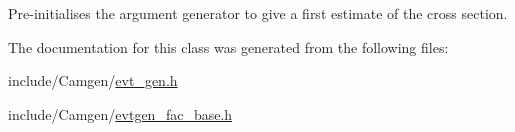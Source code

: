 Pre-\/initialises the argument generator to give a first estimate of the cross section. 



The documentation for this class was generated from the following files\+:\begin{DoxyCompactItemize}
\item 
include/\+Camgen/\hyperlink{a00634}{evt\+\_\+gen.\+h}\item 
include/\+Camgen/\hyperlink{a00636}{evtgen\+\_\+fac\+\_\+base.\+h}\end{DoxyCompactItemize}
